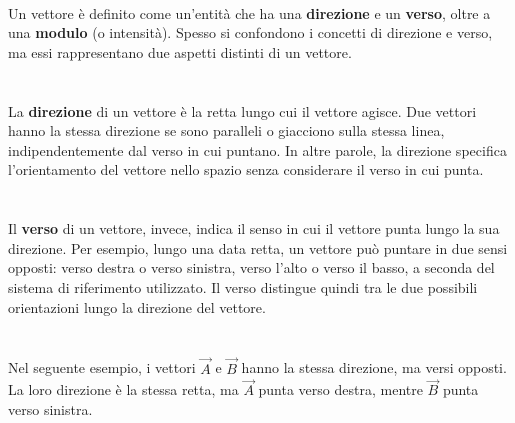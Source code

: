 \begin{nota}
  \phantom{text}
  \leavevmode\\
  Un vettore è definito come un'entità che ha una \textbf{direzione}
  e un \textbf{verso}, oltre a una \textbf{modulo} (o intensità).
  Spesso si confondono i concetti di direzione e verso, ma essi
  rappresentano due aspetti distinti di un vettore.
  \leavevmode\\\\
  \leavevmode\\
  La \textbf{direzione} di un vettore è la retta lungo cui il vettore
  agisce. Due vettori hanno la stessa direzione se sono paralleli o
  giacciono sulla stessa linea, indipendentemente dal verso in cui
  puntano. In altre parole, la direzione specifica l'orientamento del
  vettore nello spazio senza considerare il verso in cui punta.
  \leavevmode\\\\
  \leavevmode\\
  Il \textbf{verso} di un vettore, invece, indica il senso in cui il
  vettore punta lungo la sua direzione. Per esempio, lungo una data
  retta, un vettore può puntare in due sensi opposti: verso destra o
  verso sinistra, verso l'alto o verso il basso, a seconda del
  sistema di riferimento utilizzato. Il verso distingue quindi tra le
  due possibili orientazioni lungo la direzione del vettore.
  \leavevmode\\\\
  \leavevmode\\
  Nel seguente esempio, i vettori \(\vec{A}\) e \(\vec{B}\) hanno la
  stessa direzione, ma versi opposti. La loro direzione è la stessa
  retta, ma \(\vec{A}\) punta verso destra, mentre \(\vec{B}\) punta
  verso sinistra.
  \leavevmode\\
  \begin{center}
\end{center}
\end{nota}
